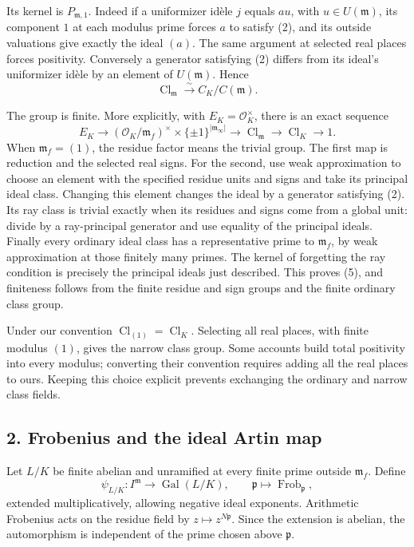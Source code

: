 \documentclass[11pt,a4paper]{article}
\begin{document}
Its kernel is \(P_{\mathfrak m,1}\). Indeed if a uniformizer idèle \(j\)
equals \(a u\), with \(u\in U(\mathfrak m)\), its component \(1\) at
each modulus prime forces \(a\) to satisfy (2), and its outside
valuations give exactly the ideal \((a)\). The same argument at selected
real places forces positivity. Conversely a generator satisfying (2)
differs from its ideal's uniformizer idèle by an element of
\(U(\mathfrak m)\). Hence \[
\operatorname{Cl}_{\mathfrak m}\xrightarrow{\sim}C_K/C(\mathfrak m).
\tag{4}
\]

The group is finite. More explicitly, with \(E_K=\mathcal O_K^\times\),
there is an exact sequence \[
E_K\longrightarrow
(\mathcal O_K/\mathfrak m_f)^\times\times\{\pm1\}^{|\mathfrak m_\infty|}
\longrightarrow\operatorname{Cl}_{\mathfrak m}
\longrightarrow\operatorname{Cl}_K\longrightarrow1.
\tag{5}
\] When \(\mathfrak m_f=(1)\), the residue factor means the trivial
group. The first map is reduction and the selected real signs. For the
second, use weak approximation to choose an element with the specified
residue units and signs and take its principal ideal class. Changing
this element changes the ideal by a generator satisfying (2). Its ray
class is trivial exactly when its residues and signs come from a global
unit: divide by a ray-principal generator and use equality of the
principal ideals. Finally every ordinary ideal class has a
representative prime to \(\mathfrak m_f\), by weak approximation at
those finitely many primes. The kernel of forgetting the ray condition
is precisely the principal ideals just described. This proves (5), and
finiteness follows from the finite residue and sign groups and the
finite ordinary class group.

Under our convention \(\operatorname{Cl}_{(1)}=\operatorname{Cl}_K\).
Selecting all real places, with finite modulus \((1)\), gives the narrow
class group. Some accounts build total positivity into every modulus;
converting their convention requires adding all the real places to ours.
Keeping this choice explicit prevents exchanging the ordinary and narrow
class fields.

\subsection{2. Frobenius and the ideal Artin
map}\label{frobenius-and-the-ideal-artin-map}

Let \(L/K\) be finite abelian and unramified at every finite prime
outside \(\mathfrak m_f\). Define \[
\psi_{L/K}:I^{\mathfrak m}\longrightarrow\operatorname{Gal}(L/K),
\qquad
\mathfrak p\longmapsto\operatorname{Frob}_{\mathfrak p},
\tag{6}
\] extended multiplicatively, allowing negative ideal exponents.
Arithmetic Frobenius acts on the residue field by
\(z\mapsto z^{N\mathfrak p}\). Since the extension is abelian, the
automorphism is independent of the prime chosen above \(\mathfrak p\).
\end{document}

